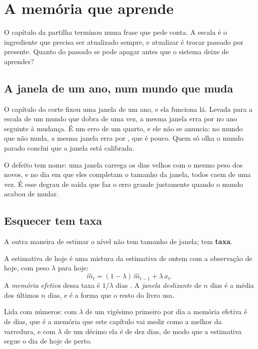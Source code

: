 \chapter{A memória que aprende}\label{cap:memoria}

O capítulo da partilha terminou numa frase que pede conta. A escala é o ingrediente que precisa ser
atualizado sempre, e atualizar é trocar passado por presente. Quanto do passado se pode apagar antes
que o sistema deixe de aprender?

\section{A janela de um ano, num mundo que muda}

O capítulo do corte fixou uma janela de um ano, e ela funciona lá. Levada
para a escala de um mundo que dobra de uma vez, a mesma janela erra por \numEsquecimentoJanelaDuzentosECinquenta{}
no ano seguinte à mudança. É um erro de um quarto, e ele não se anuncia: no mundo que não muda, a
mesma janela erra por \numEsquecimentoPisoJanelaDuzentosECinquenta{}, que é pouco. Quem só olha o mundo
parado conclui que a janela está calibrada.

O defeito tem nome: uma janela carrega os dias velhos com o mesmo peso dos novos, e no dia em que
eles completam o tamanho da janela, todos caem de uma vez\cite{grossberg2020path}. É esse degrau de saída que faz o erro
grande justamente quando o mundo acabou de mudar.

\section{Esquecer tem taxa}

A outra maneira de estimar o nível não tem tamanho de janela; tem \textbf{taxa}.

\begin{definicao}\label{def:esquecimento}
A estimativa de hoje é uma mistura da estimativa de ontem com a observação de hoje, com peso
$\lambda$ para hoje:
\[
\hat m_t = (1-\lambda)\,\hat m_{t-1} + \lambda\, x_t .
\]
A \emph{memória efetiva} dessa taxa é $1/\lambda$ dias \cite{box2008time}. A \emph{janela deslizante} de $n$ dias é a
média dos últimos $n$ dias, e é a forma que o resto do livro usa.
\end{definicao}

Lida com números: com $\lambda$ de um vigésimo primeiro por dia a memória efetiva é de
\numEsquecimentoMelhorMemoria{} dias, que é a memória que este capítulo vai medir como a melhor da
varredura, e com $\lambda$ de um décimo ela é de dez dias, de modo que a estimativa segue o dia de
hoje de perto.

